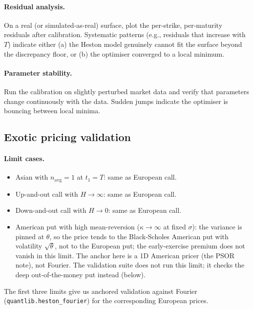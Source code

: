 \documentclass[11pt]{article}
\theoremstyle{plain}
\theoremstyle{definition}
\theoremstyle{remark}
\begin{document}
\paragraph{Residual analysis.} On a real (or simulated-as-real) surface, plot the per-strike, per-maturity residuals after calibration. Systematic patterns (e.g., residuals that increase with $T$) indicate either (a) the Heston model genuinely cannot fit the surface beyond the discrepancy floor, or (b) the optimiser converged to a local minimum.

\paragraph{Parameter stability.} Run the calibration on slightly perturbed market data and verify that parameters change continuously with the data. Sudden jumps indicate the optimiser is bouncing between local minima.

\subsection{Exotic pricing validation}

\paragraph{Limit cases.}
\begin{itemize}[topsep=2pt]
    \item Asian with $n_{\mathrm{avg}} = 1$ at $t_1 = T$: same as European call.
    \item Up-and-out call with $H \to \infty$: same as European call.
    \item Down-and-out call with $H \to 0$: same as European call.
    \item American put with high mean-reversion ($\kappa \to \infty$ at fixed $\sigma$): the variance is pinned at $\theta$, so the price tends to the Black-Scholes American put with volatility $\sqrt{\theta}$, not to the European put; the early-exercise premium does not vanish in this limit. The anchor here is a 1D American pricer (the PSOR note), not Fourier. The validation suite does not run this limit; it checks the deep out-of-the-money put instead (below).
\end{itemize}
The first three limits give us anchored validation against Fourier (\texttt{quantlib.heston\_fourier}) for the corresponding European prices.
\end{document}
